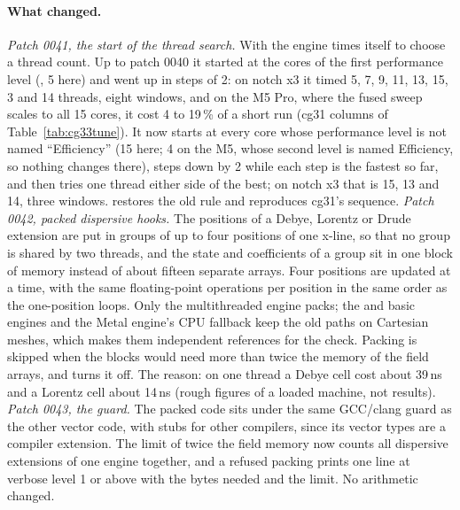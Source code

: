 \paragraph{What changed.}
\emph{Patch 0041, the start of the thread search.} With  the engine times itself to choose a thread count.
Up to patch 0040 it started at the cores of the first performance level (, 5 here) and went up in
steps of 2: on notch x3 it timed 5, 7, 9, 11, 13, 15, 3 and 14 threads, eight windows, and on the M5 Pro, where the fused
sweep scales to all 15 cores, it cost 4 to 19\,\% of a short run (cg31 columns of Table~\ref{tab:cg33tune}). It now starts
at every core whose performance level is not named ``Efficiency'' (15 here; 4 on the M5, whose second level is named
Efficiency, so nothing changes there), steps down by 2 while each step is the fastest so far, and then tries one thread
either side of the best; on notch x3 that is 15, 13 and 14, three windows.  restores the old
rule and reproduces cg31's sequence.
\emph{Patch 0042, packed dispersive hooks.} The positions of a Debye, Lorentz or Drude extension are put in groups of up to
four positions of one x-line, so that no group is shared by two threads, and the state and coefficients of a group sit in
one block of memory instead of about fifteen separate arrays. Four positions are updated at a time, with the same
floating-point operations per position in the same order as the one-position loops. Only the multithreaded engine packs;
the  and basic engines and the Metal engine's CPU fallback keep the old paths on Cartesian meshes, which
makes them independent references for the check. Packing is skipped when the blocks would need more than twice the memory
of the field arrays, and  turns it off. The reason: on one thread a Debye cell cost about 39\,ns
and a Lorentz cell about 14\,ns (rough figures of a loaded machine, not results).
\emph{Patch 0043, the guard.} The packed code sits under the same GCC/clang guard as the other vector code, with stubs
for other compilers, since its vector types are a compiler extension. The limit of twice the field memory now counts all
dispersive extensions of one engine together, and a refused packing prints one line at verbose level 1 or above with the
bytes needed and the limit. No arithmetic changed.

